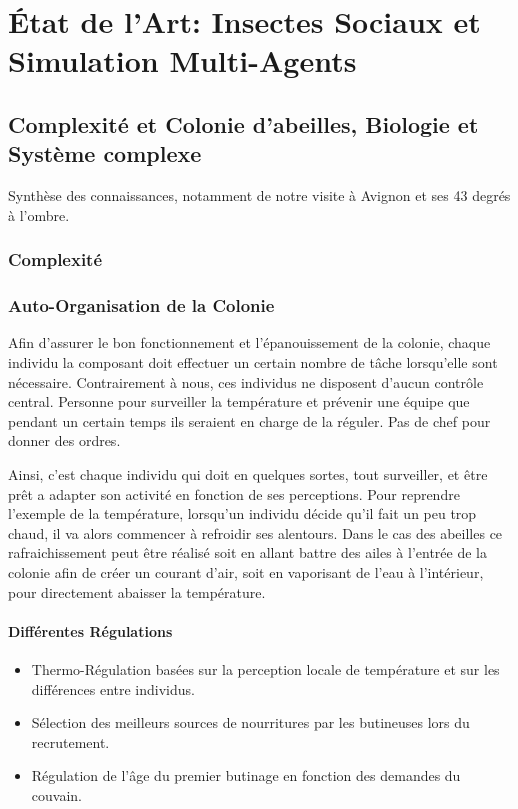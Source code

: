 \chapter{État de l'Art: Insectes Sociaux et Simulation Multi-Agents}
	\section{Complexité et Colonie d'abeilles, Biologie et Système complexe}
			Synthèse des connaissances, notamment de notre visite à Avignon et ses 43 degrés à l'ombre.\\
		\subsection{Complexité}
		\subsection{Auto-Organisation de la Colonie}
			Afin d'assurer le bon fonctionnement et l'épanouissement de la colonie, chaque individu la composant doit effectuer un certain nombre de tâche lorsqu'elle sont nécessaire. Contrairement à nous, ces individus ne disposent d'aucun contrôle central. Personne pour surveiller la température et prévenir une équipe que pendant un certain temps ils seraient en charge de la réguler. Pas de chef pour donner des ordres.
			
			Ainsi, c'est chaque individu qui doit en quelques sortes, tout surveiller, et être prêt a adapter son activité en fonction de ses perceptions. Pour reprendre l'exemple de la température, lorsqu'un individu décide qu'il fait un peu trop chaud, il va alors commencer à refroidir ses alentours. Dans le cas des abeilles ce rafraichissement peut être réalisé soit en allant battre des ailes à l'entrée de la colonie afin de créer un courant d'air, soit en vaporisant de l'eau à l'intérieur, pour directement abaisser la température. 		
			
			
			\subsubsection{Différentes Régulations}
			\begin{itemize}
				\item Thermo-Régulation basées sur la perception locale de température et sur les différences entre individus.
				\item Sélection des meilleurs sources de nourritures par les butineuses lors du recrutement.
				\item Régulation de l'âge du premier butinage en fonction des demandes du couvain.
			\end{itemize}

